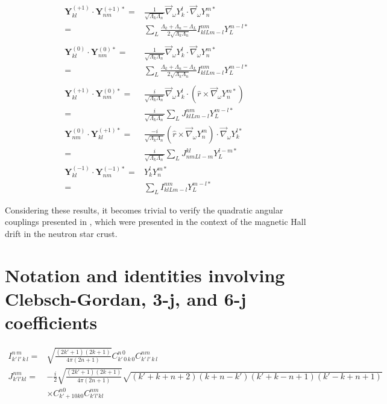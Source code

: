 \documentclass[times]{aastex631}
\newcommand{\nabang}{\vec{\nabla}_{\omega}}
\newcommand{\nin}{\noindent}
\newcommand{\ypvsh}[2]{\mathbf{Y}_{#1}^{(#2)}}
\newcommand{\yvsh}[2]{\mathbf{Y}_{#1}^{#2}}
\begin{document}
\begin{align}
  \ypvsh{kl}{+1}\cdot\yvsh{nm}{(+1)*} = & \frac{1}{\sqrt{\Lambda_k\Lambda_n}}\nabang Y_k^l\cdot\nabang Y_n^{m*} \nonumber\\
  = & \sum_L\frac{\Lambda_k+\Lambda_n-\Lambda_L}{2\sqrt{\Lambda_k\Lambda_n}}I_{k l L m-l}^{n m}Y_L^{m-l *}\\
  \nonumber\\
  \ypvsh{kl}{0}\cdot\yvsh{nm}{(0)*} = & \frac{1}{\sqrt{\Lambda_k\Lambda_n}}\nabang Y_k^l\cdot\nabang Y_n^{m*} \nonumber\\
  = & \sum_L\frac{\Lambda_k+\Lambda_n-\Lambda_L}{2\sqrt{\Lambda_k\Lambda_n}}I_{k l L m-l}^{n m}Y_L^{m-l *}\\
  \nonumber\\
  \ypvsh{kl}{+1}\cdot\yvsh{nm}{(0)*} = & \frac{i}{\sqrt{\Lambda_k\Lambda_n}}\nabang Y_k^l\cdot\left(\hat{r}\times\nabang Y_n^{m*}\right)\nonumber\\
  = & \frac{i}{\sqrt{\Lambda_k\Lambda_n}}\sum_L J_{k l L m-l}^{n m}Y_L^{m-l *} \\
  \ypvsh{nm}{0}\cdot\yvsh{kl}{(+1)*} = & \frac{-i}{\sqrt{\Lambda_k\Lambda_n}}\left(\hat{r}\times\nabang Y_n^{m}\right)\cdot\nabang Y_k^{l*}\nonumber\\
  = & \frac{i}{\sqrt{\Lambda_k\Lambda_n}}\sum_L J_{n m L l-m}^{k l}Y_L^{l-m *} \\
  \ypvsh{kl}{-1}\cdot\yvsh{nm}{(-1)*} = & Y_k^l Y_n^{m*}\nonumber\\
  = & \sum_L I_{k l L m-l}^{n m}Y_L^{m-l*}
\end{align}
  

\nin Considering these results, it becomes trivial to verify the quadratic angular couplings presented in \citet{GW1}, which were presented in the context of the magnetic Hall drift in the neutron star crust. 


\section{Notation and identities involving Clebsch-Gordan, 3-j, and 6-j coefficients}\label{s:cgidentities}

\begin{align}
I_{k'\,l'\,k\,l}^{n\,m} = & \sqrt{\frac{(2k'+1)(2k+1)}{4\pi(2n+1)}}C_{k'\,0\,k\,0}^{n\,0}C_{k'\,l'\,k\,l}^{n m}\\
J_{k' l' k l}^{n m} = & -\frac{i}{2}\sqrt{\frac{(2k'+1)(2k+1)}{4\pi(2n+1)}}\sqrt{(k'+k+n+2)(k+n-k')(k'+k-n+1)(k'-k+n+1)}\nonumber\\
 & \times C_{k'+1 0 k 0}^{n 0} C_{k' l' k l}^{n m}
\end{align}
\end{document}
